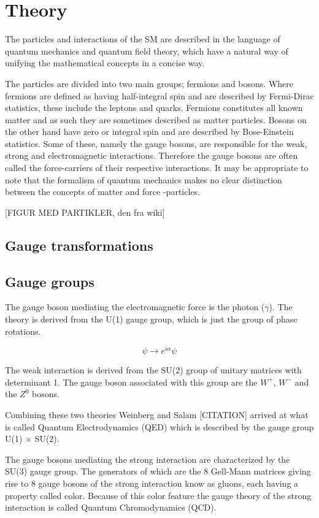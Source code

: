 \section{Theory}
The particles and interactions of the SM are described in the language of quantum mechanics and quantum field theory, which have a natural way of unifying the mathematical concepts in a concise way.

The particles are divided into two main groups; fermions and bosons. Where fermions are defined as having half-integral spin and are described by Fermi-Dirac statistics, these include the leptons and quarks. Fermions constitutes all known matter and as such they are sometimes described as matter particles. Bosons on the other hand have zero or integral spin and are described by Bose-Einstein statistics. Some of these, namely the gauge bosons, are responsible for the weak, strong and electromagnetic interactions. Therefore the gauge bosons are often called the force-carriers of their respective interactions. It may be appropriate to note that the formalism of quantum mechanics makes no clear distinction between the concepts of matter and force -particles.

[FIGUR MED PARTIKLER, den fra wiki]

\subsection{Gauge transformations}

\subsection{Gauge groups}
The gauge boson mediating the electromagnetic force is the photon ($\gamma$). The theory is derived from the U(1) gauge group, which is just the group of phase rotations.

\begin{equation}
    \psi \rightarrow e^{i\alpha} \psi
\end{equation}

The weak interaction is derived from the SU(2) group of unitary matrices with determinant 1. The gauge boson associated with this group are the $W^+$, $W^-$ and the $Z^0$ bosons.

Combining these two theories Weinberg and Salam [CITATION] arrived at what is called Quantum Electrodynamics (QED) which is described by the gauge group U(1) $\times$ SU(2).

The gauge bosons mediating the strong interaction are characterized by the SU(3) gauge group. The generators of which are the 8 Gell-Mann matrices giving rise to 8 gauge bosons of the strong interaction know as gluons, each having a property called color. Because of this color feature the gauge theory of the strong interaction is called Quantum Chromodynamics (QCD).

